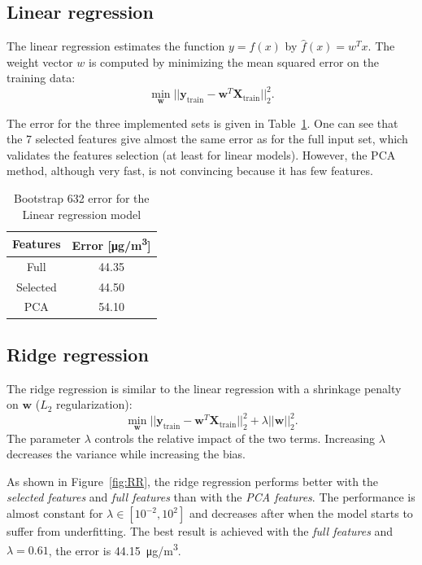 \documentclass[journal,11pt]{IEEEtran}
\begin{document}
\subsection{Linear regression}
 
The linear regression estimates the function $y = f(x)$ by $\hat{f}(x) = w^Tx$. The weight vector $w$ is computed by minimizing the mean squared error on the training data: $$\displaystyle \min_{\mathbf{w}} ||\mathbf{y}_{\text{train}} - \mathbf{w}^T\mathbf{X}_{\text{train}}||_2^2.$$

The error for the three implemented sets is given in Table~\ref{tab:linreg}. One can see that the 7 selected features give almost the same error as for the full input set, which validates the features selection (at least for linear models). However, the PCA method, although very fast, is not convincing because it has few features.

\begin{table}[H]
\setlength{}
\centering
\begin{tabular}{cc}
\hline
 Features &  Error [\si{\micro g/m^3}] \\ \hline
 Full  & 44.35 \\
 Selected  & 44.50 \\
 PCA  & 54.10 \\ \hline
\end{tabular}
\vspace*{3mm}
\caption{Bootstrap 632 error for the Linear regression model}
\label{tab:linreg}
\end{table}

\subsection{Ridge regression}

The ridge regression is similar to the linear regression with a shrinkage penalty on $\mathbf{w}$ ($L_2$ regularization): $$\displaystyle \min_{\mathbf{w}} ||\mathbf{y}_{\text{train}} - \mathbf{w}^T\mathbf{X}_{\text{train}}||_2^2 + \lambda ||\mathbf{w}||_2^2.$$
The parameter $\lambda$ controls the relative impact of the two terms. Increasing $\lambda$ decreases the variance while increasing the bias. 

As shown in Figure~\ref{fig:RR}, the ridge regression performs better with the \textit{selected features} and \textit{full features} than with the \textit{PCA features}. The performance is almost constant for $\lambda \in [10^{-2},10^2]$ and decreases after when the model starts to suffer from underfitting. The best result is achieved with the \textit{full features} and $\lambda = 0.61$, the error is \SI{44.15}{\micro g/m^3}. 
\end{document}
